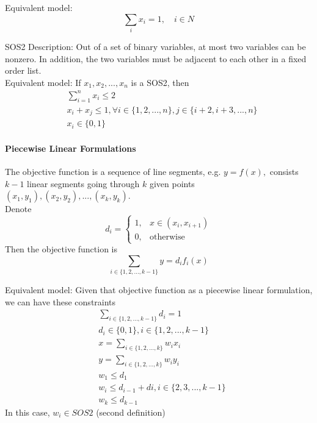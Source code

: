             Equivalent model:
            \begin{equation*} \sum_{i} x_i = 1, \quad i \in N \end{equation*}
            
            SOS2 Description: Out of a set of binary variables, at most two variables can be nonzero. In addition, the two variables must be adjacent to each other in a fixed order list.\\
            
            Equivalent model:
            If $x_1, x_2, ... , x_n$ is a SOS2, then
            \begin{align*}
                & \sum_{i=1}^{n} x_i \le 2  \\
                & x_i + x_j \le 1, \forall i \in \{1, 2,..., n\}, j \in \{i+2, i+3, ..., n\}  \\
                &x_i \in \{0, 1\}
            \end{align*}
                            
        \paragraph{Piecewise Linear Formulations}
             The objective function is a sequence of line segments, e.g. $y=f(x), $ consists $k-1$ linear segments going through $k$ given points $(x_1, y_1), (x_2, y_2), ... ,(x_k, y_k)$.\\
            Denote 
            \begin{equation*}d_i=\begin{cases}1, & x\in (x_i, x_{i+1})\\0, & \text{otherwise} \end{cases}\end{equation*}
            Then the objective function is
            \begin{equation*}\sum_{i \in \{1, 2, ..., k-1\}} y = d_if_i(x) \end{equation*} 
            
            Equivalent model: Given that objective function as a piecewise linear formulation, we can have these constraints\\
            \begin{align*}
                &\sum_{i \in \{1, 2, ..., k-1\}} d_i =1  \\
                &d_i \in \{0, 1\}, i \in \{1, 2, ..., k-1\}  \\
                & x = \sum_{i \in \{1, 2, ..., k\}} w_i x_i  \\
                & y = \sum_{i \in \{1, 2, ..., k\}} w_i y_i  \\
                & w_1 \le d_1  \\
                & w_i \le d_{i-1} + d{i}, i \in \{2, 3, ..., k-1\}  \\
                & w_k \le d_{k-1} 
            \end{align*}
            In this case, $ w_i \in SOS2$ (second definition)       
                                
